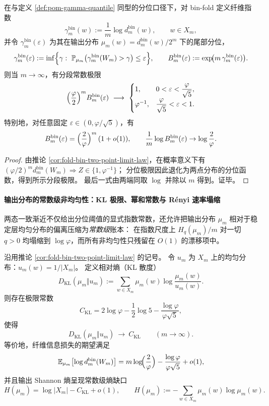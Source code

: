 \begin{corollary}\label{cor:fold-bin-quantile-threshold-constant}
在与定义 \ref{def:pom-gamma-quantile} 同型的分位口径下，对 bin-fold 定义纤维指数
\[
\gamma^{\mathrm{bin}}_m(w):=\frac{1}{m}\log d^{\mathrm{bin}}_m(w),\qquad w\in X_m,
\]
并令 \(\gamma^{\mathrm{bin}}_m(\varepsilon)\) 为其在输出分布 \(\mu_m(w)=d^{\mathrm{bin}}_m(w)/2^m\) 下的尾部分位，
\[
\gamma^{\mathrm{bin}}_{m}(\varepsilon):=\inf\Bigl\{\gamma:\ \mathbb{P}_{\mu_m}\bigl(\gamma^{\mathrm{bin}}_m(W_m)>\gamma\bigr)\le \varepsilon\Bigr\},
\qquad
B^{\mathrm{bin}}_m(\varepsilon):=\exp\!\bigl(m\,\gamma^{\mathrm{bin}}_m(\varepsilon)\bigr).
\]
则当 \(m\to\infty\)，有分段常数极限
\[
\Bigl(\frac{\varphi}{2}\Bigr)^m B^{\mathrm{bin}}_m(\varepsilon)\ \longrightarrow\
\begin{cases}
1,& 0<\varepsilon<\displaystyle\frac{\varphi}{\sqrt5},\\[6pt]
\varphi^{-1},& \displaystyle\frac{\varphi}{\sqrt5}<\varepsilon<1.
\end{cases}
\]
特别地，对任意固定 \(\varepsilon\in(0,\varphi/\sqrt5)\)，有
\[
B^{\mathrm{bin}}_m(\varepsilon)
=\Bigl(\frac{2}{\varphi}\Bigr)^m\,(1+o(1)),
\qquad
\frac{1}{m}\log B^{\mathrm{bin}}_m(\varepsilon)\to \log\frac{2}{\varphi}.
\]
\end{corollary}

\begin{proof}
由推论 \ref{cor:fold-bin-two-point-limit-law}，在概率意义下有
\(
(\varphi/2)^m d^{\mathrm{bin}}_m(W_m)\Rightarrow Z\in\{1,\varphi^{-1}\}
\)；
分位极限因此退化为两点分布的分位函数，得到所示分段极限。
最后一式由两端同取 \(\log\) 并除以 \(m\) 得到。证毕。
\end{proof}

\paragraph{输出分布的常数级非均匀性：KL 极限、幂和常数与 R\'enyi 速率塌缩}
两态一致渐近不仅给出分位阈值的显式指数常数，还允许把输出分布 \(\mu_m\) 相对于稳定层均匀分布的偏离压缩为\emph{常数级}账本：
在指数尺度上 \(H_q(\mu_m)/m\) 对一切 \(q>0\) 均塌缩到 \(\log\varphi\)，而所有非均匀性只残留在 \(O(1)\) 的漂移项中。

\begin{proposition}\label{prop:fold-bin-kl-constant}
沿用推论 \ref{cor:fold-bin-two-point-limit-law} 的记号。
令 \(u_m\) 为 \(X_m\) 上的均匀分布：\(u_m(w)=1/|X_m|\)。
定义相对熵（KL 散度）
\[
D_{\mathrm{KL}}(\mu_m\Vert u_m)
:=\sum_{w\in X_m}\mu_m(w)\log\frac{\mu_m(w)}{u_m(w)}.
\]
则存在极限常数
\[
C_{\mathrm{KL}}
=2\log\varphi-\frac12\log 5-\frac{\log\varphi}{\varphi\sqrt5},
\]
使得
\[
D_{\mathrm{KL}}(\mu_m\Vert u_m)\ \longrightarrow\ C_{\mathrm{KL}}
\qquad(m\to\infty).
\]
等价地，纤维信息损失的期望满足
\[
\mathbb{E}_{\mu_m}\bigl[\log d^{\mathrm{bin}}_m(W_m)\bigr]
=m\log\!\Bigl(\frac{2}{\varphi}\Bigr)-\frac{\log\varphi}{\varphi\sqrt5}+o(1),
\]
并且输出 Shannon 熵呈现常数级熵缺口
\[
H(\mu_m)=\log|X_m|-C_{\mathrm{KL}}+o(1),
\qquad
H(\mu_m):=-\sum_{w\in X_m}\mu_m(w)\log \mu_m(w).
\]
\end{proposition}

